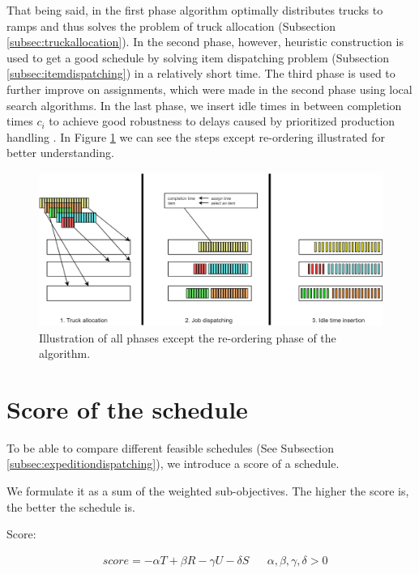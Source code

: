 \documentclass{ctuthesis}
\begin{document}
That being said, in the first phase algorithm optimally distributes trucks to ramps and thus solves the problem of truck allocation (Subsection \ref{subsec:truckallocation}). In the second phase, however, heuristic construction is used to get a good schedule by solving item dispatching problem (Subsection \ref{subsec:itemdispatching}) in a relatively short time. The third phase is used to further improve on assignments, which were made in the second phase using local search algorithms. In the last phase, we insert idle times in between completion times $c_i$ to achieve good robustness to delays caused by prioritized production handling \cite{pinedo}. In Figure \ref{fig:algo} we can see the steps except re-ordering illustrated for better understanding.

\begin{figure}[H]
\includegraphics[width=1.0\linewidth]{algo.jpg}
\caption{Illustration of all phases except the re-ordering phase of the algorithm.}
\label{fig:algo}
\end{figure}

\section{Score of the schedule}

To be able to compare different feasible schedules (See Subsection \ref{subsec:expeditiondispatching}), we introduce a score of a schedule. 

We formulate it as a sum of the weighted sub-objectives. The higher the score is, the better the schedule is.

Score:

\begin{equation}
\begin{aligned}
    &score = -\alpha T + \beta R - \gamma  U - \delta S && \alpha, \beta, \gamma, \delta > 0
\end{aligned}
\end{equation}
\end{document}
